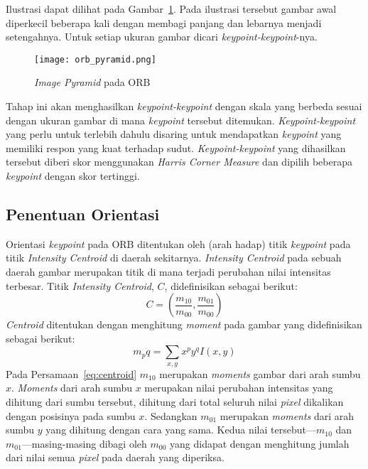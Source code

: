 Ilustrasi dapat dilihat pada Gambar~\ref{fig:orb_pyramid}. Pada ilustrasi tersebut gambar awal diperkecil beberapa kali dengan membagi panjang dan lebarnya menjadi setengahnya. Untuk setiap ukuran gambar dicari \textit{keypoint-keypoint}-nya.

\begin{figure}[H]
	\centering
	\texttt{[image: orb\_pyramid.png]}
	\caption{\textit{Image Pyramid} pada ORB}
	\label{fig:orb_pyramid}	
\end{figure}

Tahap ini akan menghasilkan \textit{keypoint-keypoint} dengan skala yang berbeda sesuai dengan ukuran gambar di mana \textit{keypoint} tersebut ditemukan. \textit{Keypoint-keypoint} yang perlu untuk terlebih dahulu disaring untuk mendapatkan \textit{keypoint} yang memiliki respon yang kuat terhadap sudut. \textit{Keypoint-keypoint} yang dihasilkan tersebut diberi skor menggunakan \textit{Harris Corner Measure} dan dipilih beberapa \textit{keypoint} dengan skor tertinggi.

\subsection{Penentuan Orientasi}
\label{subsec:orb_orientasi}
Orientasi \textit{keypoint} pada ORB ditentukan oleh (arah hadap) titik \textit{keypoint} pada titik \textit{Intensity Centroid} di daerah sekitarnya. \textit{Intensity Centroid} pada sebuah daerah gambar merupakan titik di mana terjadi perubahan nilai intensitas terbesar. Titik \textit{Intensity Centroid}, $C$, didefinisikan sebagai berikut:
\begin{equation}
	C=(\frac{m_{10}}{m_{00}}, \frac{m_{01}}{m_{00}})
	\label{eq:centroid}
\end{equation}
\textit{Centroid} ditentukan dengan menghitung \textit{moment} pada gambar yang didefinisikan sebagai berikut:
\begin{equation}
	m_pq=\sum_{x,y}x^py^qI(x,y)
\end{equation}
Pada Persamaan~\ref{eq:centroid} $m_{10}$ merupakan \textit{moments} gambar dari arah sumbu $x$. \textit{Moments} dari arah sumbu $x$ merupakan nilai perubahan intensitas yang dihitung dari sumbu tersebut, dihitung dari total seluruh nilai \textit{pixel} dikalikan dengan posisinya pada sumbu $x$. Sedangkan $m_{01}$ merupakan \textit{moments} dari arah sumbu $y$ yang dihitung dengan cara yang sama. Kedua nilai tersebut---$m_{10}$ dan $m_{01}$---masing-masing dibagi oleh $m_{00}$ yang didapat dengan menghitung jumlah dari nilai semua \textit{pixel} pada daerah yang diperiksa.


